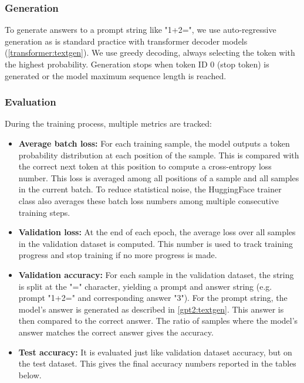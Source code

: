 \subsubsection{Generation}
\label{setup:generation}

To generate answers to a prompt string like "1+2=", we use auto-regressive generation as is standard practice with transformer decoder models (\cref{transformer:textgen}). We use greedy decoding, always selecting the token with the highest probability. Generation stops when token ID 0 (stop token) is generated or the model maximum sequence length is reached.


\subsubsection{Evaluation}

During the training process, multiple metrics are tracked:

\begin{itemize}
	\item \textbf{Average batch loss:}
	For each training sample, the model outputs a token probability distribution at each position of the sample. This is compared with the correct next token at this position to compute a cross-entropy loss number. This loss is averaged among all positions of a sample and all samples in the current batch. To reduce statistical noise, the HuggingFace trainer class also averages these batch loss numbers among multiple consecutive training steps.
	
	\item \textbf{Validation loss:}
	At the end of each epoch, the average loss over all samples in the validation dataset is computed. This number is used to track training progress and stop training if no more progress is made.
	
	\item \textbf{Validation accuracy:}
	For each sample in the validation dataset, the string is split at the "=" character, yielding a prompt and answer string (e.g. prompt "1+2=" and corresponding answer "3"). For the prompt string, the model's answer is generated as described in \cref{gpt2:textgen}. This answer is then compared to the correct answer. The ratio of samples where the model's answer matches the correct answer gives the accuracy.
	
	\item \textbf{Test accuracy:}
	It is evaluated just like validation dataset accuracy, but on the test dataset. This gives the final accuracy numbers reported in the tables below.
\end{itemize}


